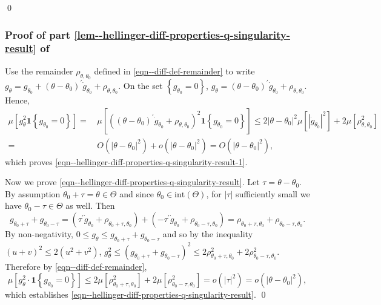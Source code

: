 \qed

\subsubsection{Proof of part
\ref{lem--hellinger-diff-properties-q-singularity-result} of
}

Use the remainder \(\rho_{\theta, \theta_{0}}\) defined in
\eqref{eqn--diff-def-remainder} to write \(g_{\theta} = g_{\theta_{0}} + (\theta
- \theta_{0})^{\prime} \dot{g}_{\theta_{0}} + \rho_{\theta, \theta_{0}}\).
On the set \(\left\{ g_{\theta_{0}} = 0 \right\}\),
\(g_{\theta} = (\theta - \theta_{0})^{\prime} \dot{g}_{\theta_{0}} +
\rho_{\theta, \theta_{0}}\).
Hence,
\begin{equation*}
  \begin{split}
    \mu \left[ g_{\theta}^{2} \mathbf{1} \left\{ g_{\theta_{0}} = 0 \right\}
    \right] =
    & \, \mu \left[ \left( (\theta - \theta_{0})^{\prime} \dot{g}_{\theta_{0}} +
    \rho_{\theta, \theta_{0}} \right)^{2} \mathbf{1} \left\{ g_{\theta_{0}} = 0
    \right\} \right]
    \leq
    2 |\theta - \theta_{0}|^{2} \mu \left[ \left|
    \dot{g}_{\theta_{0}} \right|^{2} \right] + 2 \mu \left[ \rho_{\theta,
    \theta_{0}}^{2} \right] \\
    =
    & \, O \left( |\theta - \theta_{0}|^{2} \right) + o \left( |\theta -
    \theta_{0}|^{2} \right) = O \left( |\theta - \theta_{0}|^{2} \right),
  \end{split}
\end{equation*}
which proves \eqref{eqn--hellinger-diff-properties-q-singularity-result-1}.

Now we prove \eqref{eqn--hellinger-diff-properties-q-singularity-result}.
Let \(\tau = \theta - \theta_{0}\).
By assumption \(\theta_{0} + \tau = \theta \in \Theta\) and since \(\theta_{0}
\in \mathrm{int} (\Theta)\), for \(|\tau|\) sufficiently small we have
\(\theta_{0} - \tau \in \Theta\) as well.
Then
\begin{equation*}
  g_{\theta_{0} + \tau} + g_{\theta_{0} - \tau} = \left( \tau^{\prime}
  \dot{g}_{\theta_{0}} + \rho_{\theta_{0} + \tau, \theta_{0}} \right) + \left( -
  \tau^{\prime} \dot{g}_{\theta_{0}} + \rho_{\theta_{0} - \tau, \theta_{0}}
  \right) = \rho_{\theta_{0} + \tau, \theta_{0}} + \rho_{\theta_{0} - \tau,
  \theta_{0}}.
\end{equation*}
By non-negativity, \(0 \leq g_{\theta} \leq g_{\theta_{0} + \tau} +
g_{\theta_{0} - \tau}\) and so by the inequality \((u + v)^{2} \leq 2 \left(
u^{2} + v^{2} \right)\), \(g_{\theta}^{2} \leq \left( g_{\theta_{0} + \tau} +
g_{\theta_{0} - \tau} \right)^{2} \leq 2 \rho_{\theta_{0} + \tau,
\theta_{0}}^{2} + 2 \rho_{\theta_{0} - \tau, \theta_{0}}^{2}\).
Therefore by \eqref{eqn--diff-def-remainder},
\begin{equation*}
  \mu \left[ g_{\theta}^{2} \cdot \mathbf{1} \left\{ g_{\theta_{0}} = 0 \right\}
  \right] \leq 2 \mu \left[ \rho_{\theta_{0} + \tau, \theta_{0}}^{2} \right] + 2
  \mu \left[ \rho_{\theta_{0} - \tau, \theta_{0}}^{2} \right] = o \left(
  |\tau|^{2} \right) = o \left( |\theta - \theta_{0}|^{2} \right),
\end{equation*}
which establishes \eqref{eqn--hellinger-diff-properties-q-singularity-result}.
\qed

